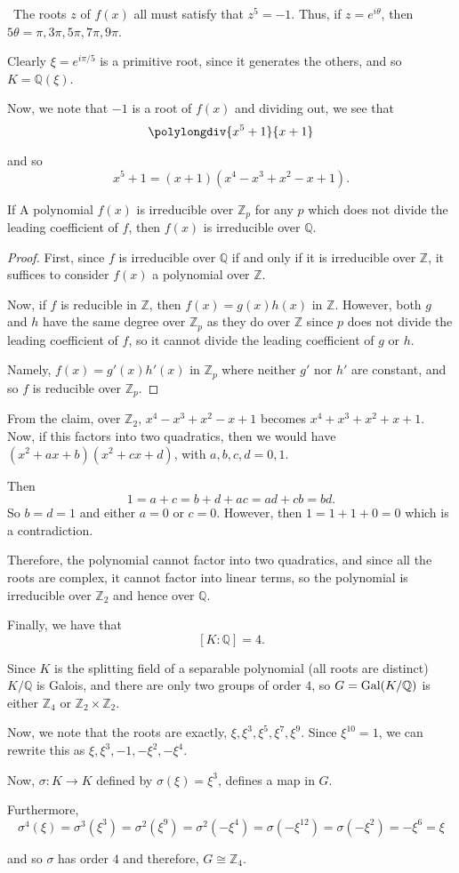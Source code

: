 \documentclass[12pt]{Qual}
\begin{document}
\begin{solution}$\,$
The roots $z$ of $f(x)$ all must satisfy that $z^5=-1$. Thus, if $z=e^{i\theta}$, then $5\theta=\pi,3\pi,5\pi,7\pi,9\pi$.

Clearly $\xi=e^{i\pi/5}$ is a primitive root, since it generates the others, and so $K=\mathbb{Q}(\xi)$.

Now, we note that $-1$ is a root of $f(x)$ and dividing out, we see that \[
     \polylongdiv{x^5+1}{x+1}
   \]

   and so $$x^5+1=(x+1)(x^4-x^3+x^2-x+1).$$

   \begin{claim} If A polynomial $f(x)$ is irreducible over $\mathbb{Z}_p$ for any $p$ which does not divide the leading coefficient of $f$, then $f(x)$ is irreducible over $\mathbb{Q}$.
   \begin{proof} First, since $f$ is irreducible over $\mathbb{Q}$ if and only if it is irreducible over $\mathbb{Z}$, it suffices to consider $f(x)$ a polynomial over $\mathbb{Z}$.

   Now, if $f$ is reducible in $\mathbb{Z}$, then $f(x)=g(x)h(x)$ in $\mathbb{Z}$. However, both $g$ and $h$ have the same degree over $\mathbb{Z}_p$ as they do over $\mathbb{Z}$ since $p$ does not divide the leading coefficient of $f$, so it cannot divide the leading coefficient of $g$ or $h$.

   Namely, $f(x)=g'(x)h'(x)$ in $\mathbb{Z}_p$ where neither $g'$ nor $h'$ are constant, and so $f$ is reducible over $\mathbb{Z}_p.$
   \end{proof}
   \end{claim}


From the claim, over $\mathbb{Z}_2$, $x^4-x^3+x^2-x+1$ becomes $x^4+x^3+x^2+x+1$. Now, if this factors into two quadratics, then we would have $(x^2+ax+b)(x^2+cx+d)$, with $a,b,c,d=0,1$.

Then $$1=a+c=b+d+ac=ad+cb=bd.$$ So $b=d=1$ and either $a=0$ or $c=0$. However, then $1=1+1+0=0$ which is a contradiction.

Therefore, the polynomial cannot factor into two quadratics, and since all the roots are complex, it cannot factor into linear terms, so the polynomial is irreducible over $\mathbb{Z}_2$ and hence over $\mathbb{Q}$.

Finally, we have that $$[K:\mathbb{Q}]=4.$$

Since $K$ is the splitting field of a separable polynomial (all roots are distinct) $K/\mathbb{Q}$ is Galois, and there are only two groups of order $4$, so $G=\text{Gal}(K/\mathbb{Q})$ is either $\mathbb{Z}_4$ or $\mathbb{Z}_2\times\mathbb{Z}_2$.

Now, we note that the roots are exactly, $\xi,\xi^3,\xi^5,\xi^7,\xi^9.$ Since $\xi^{10}=1$, we can rewrite this as $\xi,\xi^3,-1,-\xi^2,-\xi^4.$

Now, $\sigma:K\to K$ defined by $\sigma(\xi)=\xi^3$, defines a map in $G$.

Furthermore, $$\sigma^4(\xi)=\sigma^3(\xi^3)=\sigma^2(\xi^9)=\sigma^2(-\xi^4)=\sigma(-\xi^{12})=\sigma(-\xi^2)=-\xi^6=\xi$$

and so $\sigma$ has order $4$ and therefore, $G\cong\mathbb{Z}_4.$

\end{solution}
\end{document}
